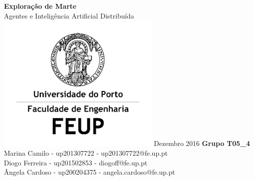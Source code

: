 \documentclass[12pt]{report}
\begin{document}
\newcommand{\sajas}{\texttt{SAJaS}\xspace}
\newcommand{\jade}{\texttt{JADE}\xspace}
\newcommand{\repast}{\texttt{Repast 3}\xspace}
\newcommand{\massim}{\texttt{MASSim2Dev}\xspace}
\newcommand{\java}{\texttt{JAVA}\xspace}
\newcommand{\acl}{\texttt{ACL}\xspace}
\newcommand{\fipa}{\texttt{FIPA}\xspace}
\newcommand{\spotter}{\emph{spotter}\xspace}
\newcommand{\Spotter}{\emph{Spotter}\xspace}
\newcommand{\spotters}{\emph{spotters}\xspace}
\newcommand{\Producer}{\emph{Producer}\xspace}
\newcommand{\producer}{\emph{producer}\xspace}
\newcommand{\producers}{\emph{producers}\xspace}
\newcommand{\Transporter}{\emph{Transporter}\xspace}
\newcommand{\transporter}{\emph{transporter}\xspace}
\newcommand{\transporters}{\emph{transporters}\xspace}

\begin{titlepage}
	\begin{center}
		\vspace*{1cm}
        \Huge
        \textbf{Exploração de Marte}
        \vspace{0.5cm} \ \\
        \LARGE
        Agentes e Inteligência Artificial Distribuída
        \vfill
		\includegraphics[width=0.6\textwidth]{FEUP_Logo}
		\break
        \small
        Dezembro 2016
        \vfill
		\vspace{1.5cm}
        \normalsize{
		\textbf{Grupo T05\_4} \\
		Marina Camilo - up201307722 - up201307722@fe.up.pt \\
		Diogo Ferreira - up201502853 - diogoff@fe.up.pt \\
		Ângela Cardoso - up200204375 - angela.cardoso@fe.up.pt
        }
	\end{center}
\end{titlepage}

\tableofcontents


\end{document}
